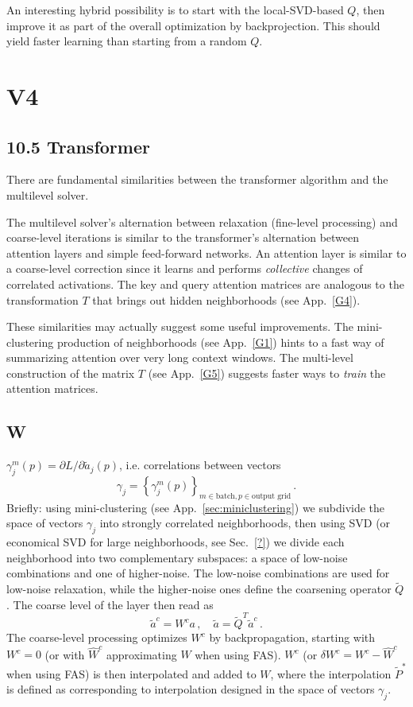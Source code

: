 \documentclass{article} %
\begin{document}
An interesting hybrid possibility is to start with the local-SVD-based $Q$, then improve it as part of the overall optimization by backprojection. This should yield faster learning than starting from a random $Q$.

\section{V4}
\subsection{10.5 Transformer}
There are fundamental similarities between the transformer algorithm \cite{transformer} and the multilevel solver.

The multilevel solver's alternation between relaxation (fine-level processing) and coarse-level iterations is similar to the transformer's alternation between attention layers and simple feed-forward networks. An attention layer is similar to a coarse-level correction since it learns and performs {\it collective} changes of correlated activations. The key and query attention matrices are analogous to the transformation $T$ that brings out hidden neighborhoods (see App.~\ref{G4}).

These similarities may actually suggest some useful improvements. The mini-clustering production of neighborhoods (see App.~\ref{G1}) hints to a fast way of summarizing attention over very long context windows. The multi-level construction of the matrix $T$ (see App.~\ref{G5}) suggests faster ways to {\it train} the attention matrices.

\subsection{W}
$\gamma^m_j(p) = \partial L/\partial \tilde{a}_j(p)$, i.e. correlations between vectors
$$
\gamma_j = \left\{ \gamma^m_j(p) \right\}_{m \in \text{batch}, p \in \text{output grid}}\,.
$$
Briefly: using mini-clustering (see App.~\ref{sec:miniclustering}) we subdivide the space of vectors $\gamma_j$ into strongly correlated neighborhoods, then using SVD (or economical SVD for large neighborhoods, see Sec.~\ref{?}) we divide each neighborhood into two complementary subspaces: a space of low-noise combinations and one of higher-noise. The low-noise combinations are used for low-noise relaxation, while the higher-noise ones define the coarsening operator $\tilde{Q}$. The coarse level of the layer then read as
\begin{equation}
    \tilde{a}^c = W^c a\,,\quad \tilde{a} = \tilde{Q}^T \tilde{a}^c\,.
    \label{11.1}
\end{equation}
The coarse-level processing optimizes $W^c$ by backpropagation, starting with $W^c = 0$ (or with $\hat{W}^c$ approximating $W$ when using FAS). $W^c$ (or $\delta W^c = W^c - \hat{W}^c$ when using FAS) is then interpolated and added to $W$, where the interpolation $\tilde{P}^*$ is defined as corresponding to interpolation designed in the space of vectors $\gamma_j$.
\end{document}
